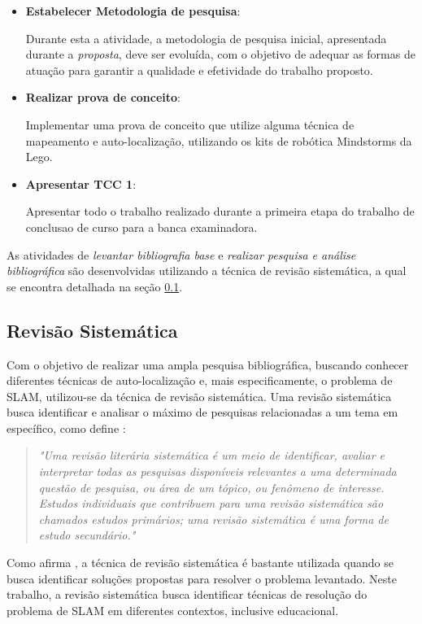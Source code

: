 \begin{itemize}
	\item \textbf{Estabelecer Metodologia de pesquisa}:

		Durante esta a atividade, a metodologia de pesquisa inicial, apresentada durante a \textit{proposta}, deve ser evoluída, com o objetivo de adequar as formas de atuação para garantir a qualidade e efetividade do trabalho proposto. 

	\item \textbf{Realizar prova de conceito}:

		Implementar uma prova de conceito que utilize alguma técnica de mapeamento e auto-localização, utilizando os kits de robótica Mindstorms da Lego.

	\item \textbf{Apresentar TCC 1}:

		Apresentar todo o trabalho realizado durante a primeira etapa do trabalho de conclusao de curso para a banca examinadora.
\end{itemize}

As atividades de \textit{levantar bibliografia base} e \textit{realizar pesquisa e análise bibliográfica} são desenvolvidas utilizando a técnica de revisão sistemática, a qual se encontra detalhada na seção \ref{sec:revisao_sistematica}.

\subsection{Revisão Sistemática} %
\label{sec:revisao_sistematica}
	
	Com o objetivo de realizar uma ampla pesquisa bibliográfica, buscando conhecer diferentes técnicas de auto-localização e, mais especificamente, o problema de SLAM, utilizou-se da técnica de revisão sistemática. Uma revisão sistemática busca identificar e analisar o máximo de pesquisas relacionadas a um tema em específico, como define \cite[p. 8]{revisaoSistematicaComunicacao}:

	 \begin{quote}
	 	\textit{"Uma revisão literária sistemática é um meio de identificar, avaliar e interpretar
		todas as pesquisas disponíveis relevantes a uma determinada questão de pesquisa,
		ou área de um tópico, ou fenômeno de interesse. Estudos individuais que contribuem
		para uma revisão sistemática são chamados estudos primários; uma revisão
		sistemática é uma forma de estudo secundário."}
	 \end{quote}

	 Como afirma \cite{revisaoSistematicaComunicacao}, a técnica de revisão sistemática é bastante utilizada quando se busca identificar soluções propostas para resolver o problema levantado. Neste trabalho, a revisão sistemática busca identificar técnicas de resolução do problema de SLAM em diferentes contextos, inclusive educacional.

